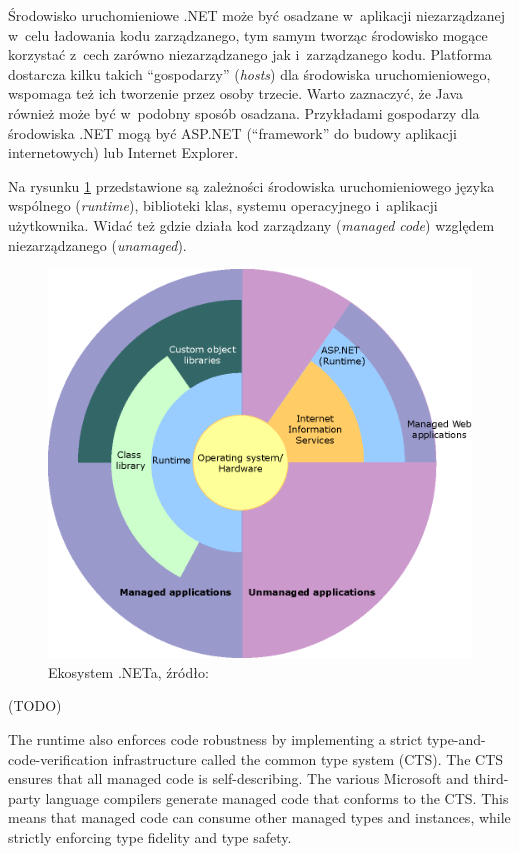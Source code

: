 Środowisko uruchomieniowe .NET może być osadzane w~aplikacji niezarządzanej w~celu ładowania kodu zarządzanego, tym samym tworząc środowisko mogące korzystać z~cech zarówno niezarządzanego jak i~zarządzanego kodu. Platforma dostarcza kilku takich ``gospodarzy'' (\emph{hosts}) dla środowiska uruchomieniowego, wspomaga też ich tworzenie przez osoby trzecie.
Warto zaznaczyć, że Java również może być w~podobny sposób osadzana.
Przykładami gospodarzy dla środowiska .NET mogą być ASP.NET (``framework'' do budowy aplikacji internetowych) lub Internet Explorer.

Na rysunku \ref{fig:dotnet-ecosystem} przedstawione są zależności środowiska uruchomieniowego języka wspólnego (\emph{runtime}), biblioteki klas, systemu operacyjnego i~aplikacji użytkownika. Widać też gdzie działa kod zarządzany (\emph{managed code}) względem niezarządzanego (\emph{unamaged}).

\begin{figure}
	\centering
		\includegraphics[scale=0.7]{img/dotnet-ecosystem.png}
	\caption{Ekosystem .NETa, źródło: \cite{dotnetoverview}}
	\label{fig:dotnet-ecosystem}
\end{figure}

(TODO)

The runtime also enforces code robustness by implementing a strict type-and-code-verification infrastructure called the common type system (CTS). The CTS ensures that all managed code is self-describing. The various Microsoft and third-party language compilers generate managed code that conforms to the CTS. This means that managed code can consume other managed types and instances, while strictly enforcing type fidelity and type safety.

